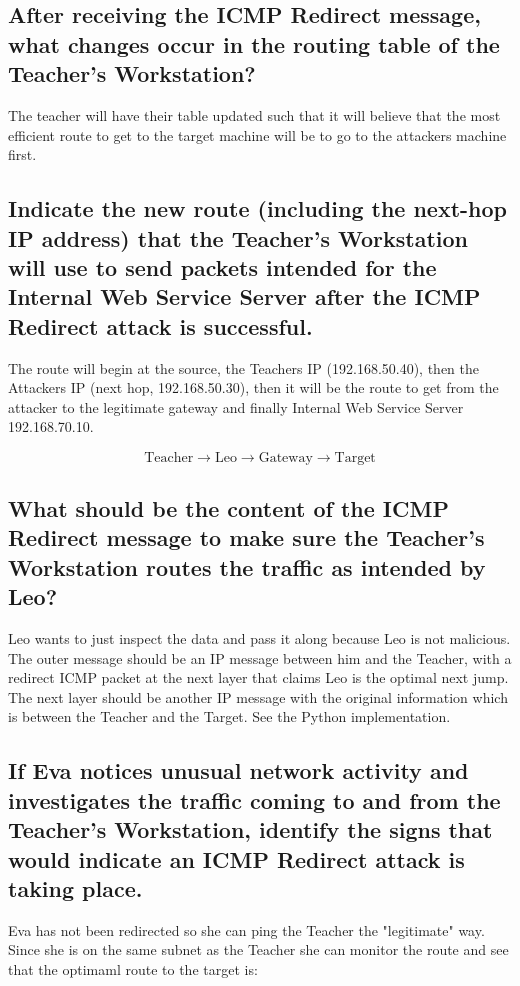 \documentclass{article}
\begin{document}
\subsection{After receiving the ICMP Redirect message, what changes occur in the routing
table of the Teacher’s Workstation?}
	The teacher will have their table updated such that it will believe that the most efficient route to get to the target machine
	will be to go to the attackers machine first.

\subsection{Indicate the new route (including the next-hop IP address) that the Teacher’s
Workstation will use to send packets intended for the Internal Web Service Server after
the ICMP Redirect attack is successful.}
	The route will begin at the source, the Teachers IP (192.168.50.40), then the Attackers IP (next hop, 192.168.50.30), then it will be the route
	to get from the attacker to the legitimate gateway and finally Internal Web Service Server 192.168.70.10.

	\[
		\text{Teacher} \xrightarrow{} \text{Leo} \xrightarrow{} \text{Gateway} \xrightarrow{} \text{Target}
	\]

\subsection{What should be the content of the ICMP Redirect message to make sure the
Teacher’s Workstation routes the traffic as intended by Leo?}
	Leo wants to just inspect the data and pass it along because Leo is not malicious. The outer message should be an IP message between
	him and the Teacher, with a redirect ICMP packet at the next layer that claims Leo is the optimal next jump. The next layer should be another IP message with
	the original information which is between the Teacher and the Target. See the Python implementation.

\subsection{If Eva notices unusual network activity and investigates the traffic coming to
and from the Teacher’s Workstation, identify the signs that would indicate an ICMP
Redirect attack is taking place.}

	Eva has not been redirected so she can ping the Teacher the "legitimate" way. Since she is on the same subnet as the Teacher she can monitor the route
	and see that the optimaml route to the target is:
	
\end{document}
